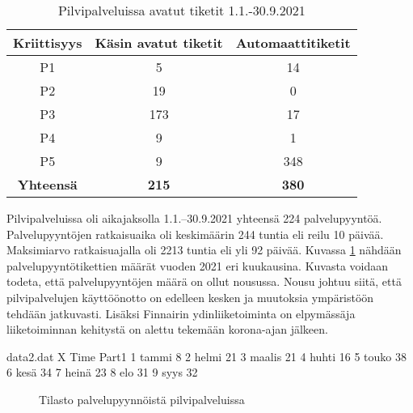 \begin{table}[ht]
\centering
\begin{tabular}{||c c c||} 
 \hline
 Kriittisyys & Käsin avatut tiketit & Automaattitiketit \\ [0.5ex] 
 \hline\hline
 P1 & 5 & 14 \\ 
 P2 & 19 & 0 \\
 P3 & 173 & 17 \\
 P4 & 9 & 1 \\
 P5 & 9 & 348 \\
 \textbf{Yhteensä} & \textbf{215} & \textbf{380}\\ [1ex] 
 \hline
\end{tabular}
\caption{Pilvipalveluissa avatut tiketit 1.1.-30.9.2021}
\label{table:pilviautomaatti}
\end{table}

Pilvipalveluissa oli aikajaksolla 1.1.--30.9.2021 yhteensä 224 palvelupyyntöä. Palvelupyyntöjen ratkaisuaika oli keskimäärin 244 tuntia eli reilu 10 päivää. Maksimiarvo ratkaisuajalla oli 2213 tuntia eli yli 92 päivää. Kuvassa \ref{fig:pilvipyynto} nähdään palvelupyyntötikettien määrät vuoden 2021 eri kuukausina. Kuvasta voidaan todeta, että palvelupyyntöjen määrä on ollut nousussa. Nousu johtuu siitä, että pilvipalvelujen käyttöönotto on edelleen kesken ja muutoksia ympäristöön tehdään jatkuvasti. Lisäksi Finnairin ydinliiketoiminta on elpymässäja liiketoiminnan kehitystä on alettu tekemään korona-ajan jälkeen.

\begin{filecontents}{data2.dat}
X Time  	Part1
1 tammi  	8
2 helmi		21
3 maalis	21
4 huhti		16
5 touko		38
6 kesä		34
7 heinä		23
8 elo       31
9 syys      32
\end{filecontents}

\begin{figure}[ht]
\caption{Tilasto palvelupyynnöistä pilvipalveluissa}
\label{fig:pilvipyynto}
\end{figure}

